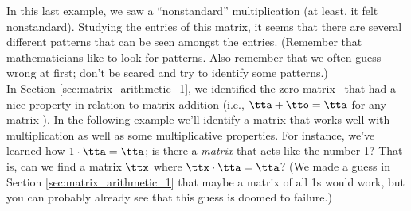 In this last example, we saw a ``nonstandard'' multiplication (at least, it felt nonstandard). Studying the entries of this matrix, it seems that there are several different patterns that can be seen amongst the entries. (Remember that mathematicians like to look for patterns. Also remember that we often guess wrong at first; don't be scared and try to identify some patterns.)\\

In Section \ref{sec:matrix_arithmetic_1}, we identified the zero matrix \tto\ that had a nice property in relation to matrix addition (i.e., $\tta+\tto = \tta$ for any matrix \tta). In the following example we'll identify a matrix that works well with multiplication as well as some multiplicative properties. For instance, we've learned how $1\cdot\tta = \tta$; is there a \textit{matrix} that acts like the number 1? That is, can we find a matrix $\ttx$ where $\ttx\cdot\tta=\tta$? (We made a guess in Section \ref{sec:matrix_arithmetic_1} that maybe a matrix of all 1s would work, but you can probably already see that this guess is doomed to failure.)

\pagebreak

